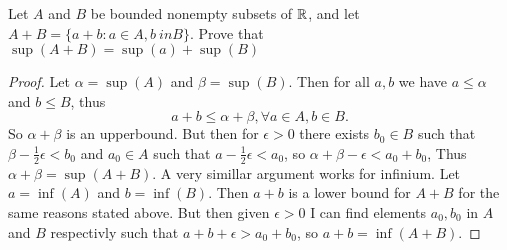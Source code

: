 \question 
Let $A$ and $B$ be bounded nonempty subsets of $\mathbb{R}$, and let $A + B = \{a + b: a \in A, b\ in B\}$. 
Prove that $\sup(A+B) = \sup(a) + \sup(B)$ 

\begin{proof}
    Let $\alpha = \sup (A)$ and $\beta = \sup (B)$. Then for all $a, b$ we have 
    $a \leq \alpha$ and $b \leq B$, thus 
    \[a + b \leq \alpha + \beta, \forall a \in A, b \in B. \] 
    So $\alpha + \beta $ is an upperbound. But then for $\epsilon > 0$ there exists $b_0 \in B$ such that 
    $ \beta - \frac{1}{2}\epsilon < b_0$ and $a_0 \in A$ such that $a - \frac{1}{2}\epsilon < a_0$, so $\alpha + \beta - \epsilon < a_0 + b_0$,
    Thus $\alpha + \beta = \sup( A + B)$. 
    A very simillar argument works for infinium. Let $a = \inf(A)$ and $b = \inf(B)$. Then $a + b$ is a lower bound for $A + B$ for the same reasons stated above. 
    But then given $\epsilon > 0$ I can find elements $a_0, b_0$ in $A$ and $B$ respectivly such that $a + b + \epsilon > a_0 + b_0$, so 
    $a + b = \inf(A + B)$. 
\end{proof}

\question 

    
